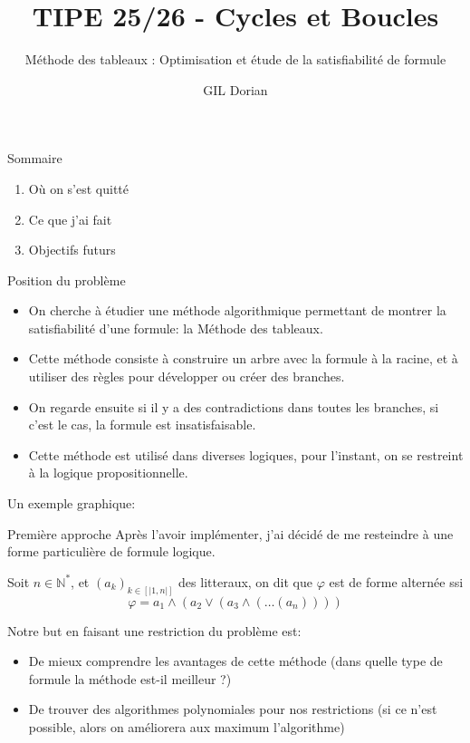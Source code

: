 \documentclass[]{beamer}
\title{TIPE 25/26 - Cycles et Boucles}
\author{GIL Dorian}
\subtitle{Méthode des tableaux : Optimisation et étude de la satisfiabilité de formule}
\date{}
\begin{document}
\begin{frame}
\titlepage
\end{frame}

\begin{frame}{Sommaire}
\begin{enumerate}
    \item Où on s'est quitté
    \item Ce que j'ai fait
    \item Objectifs futurs
\end{enumerate}
\end{frame}

\begin{frame}{Position du problème}
    \begin{itemize}[<+->]
        \item On cherche à étudier une méthode algorithmique permettant de montrer la satisfiabilité d'une formule: la Méthode des tableaux.
        \item Cette méthode consiste à construire un arbre avec la formule à la racine, et à utiliser des règles pour développer ou créer des branches.
        \item On regarde ensuite si il y a des contradictions dans toutes les branches, si c'est le cas, la formule est insatisfaisable.
        \item Cette méthode est utilisé dans diverses logiques, pour l'instant, on se restreint à la logique propositionnelle.
    \end{itemize}
    \pause
    Un exemple graphique:
\end{frame}

\begin{frame}{Première approche}
    Après l'avoir implémenter, j'ai décidé de me resteindre à une forme particulière de formule logique.
    \begin{definition}
        Soit $n\in\mathbb{N}^*$, et $(a_k)_{k\in [|1,n|]}$ des litteraux, on dit que $\varphi$ est de forme alternée ssi
        $$\varphi = a_1\land(a_2\lor(a_3\land(\dots(a_n))))$$
    \end{definition}
    Notre but en faisant une restriction du problème est:
    \begin{itemize}
        \item De mieux comprendre les avantages de cette méthode (dans quelle type de formule la méthode est-il meilleur ?)
        \item De trouver des algorithmes polynomiales pour nos restrictions (si ce n'est possible, alors on améliorera aux maximum l'algorithme)
    \end{itemize}
\end{frame}
\end{document}
